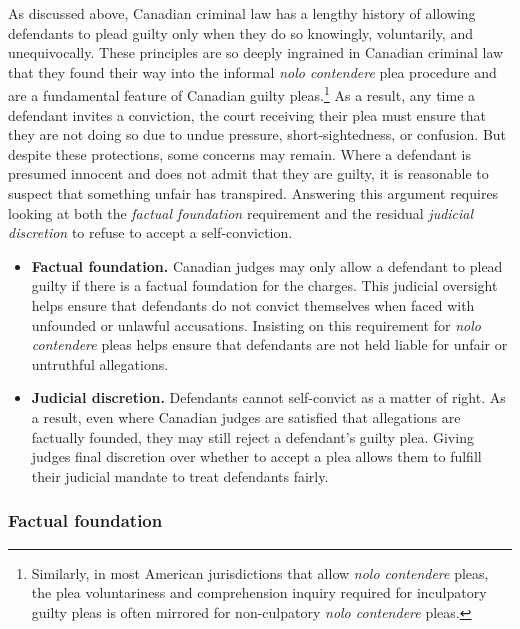 As discussed above, Canadian criminal law has a lengthy history of allowing defendants to plead guilty only when they do so knowingly, voluntarily, and unequivocally. These principles are so deeply ingrained in Canadian criminal law that they found their way into the informal \textit{nolo contendere} plea procedure and are a fundamental feature of Canadian guilty pleas.\footnote{Similarly, in most American jurisdictions that allow \textit{nolo contendere} pleas, the plea voluntariness and comprehension inquiry required for inculpatory guilty pleas is often mirrored for non-culpatory \textit{nolo contendere} pleas.} As a result, any time a defendant invites a conviction, the court receiving their plea must ensure that they are not doing so due to undue pressure, short-sightedness, or confusion. But despite these protections, some concerns may remain. Where a defendant is presumed innocent and does not admit that they are guilty, it is reasonable to suspect that something unfair has transpired. Answering this argument requires looking at both the \textit{factual foundation} requirement and the residual \textit{judicial discretion} to refuse to accept a self-conviction.

\begin{itemize}
    \item \textbf{Factual foundation.} Canadian judges may only allow a defendant to plead guilty if there is a factual foundation for the charges. This judicial oversight helps ensure that defendants do not convict themselves when faced with unfounded or unlawful accusations. Insisting on this requirement for \textit{nolo contendere} pleas helps ensure that defendants are not held liable for unfair or untruthful allegations.
    \item \textbf{Judicial discretion.} Defendants cannot self-convict as a matter of right. As a result, even where Canadian judges are satisfied that allegations are factually founded, they may still reject a defendant's guilty plea. Giving judges final discretion over whether to accept a plea allows them to fulfill their judicial mandate to treat defendants fairly.
\end{itemize}

\subsubsection{Factual foundation}

